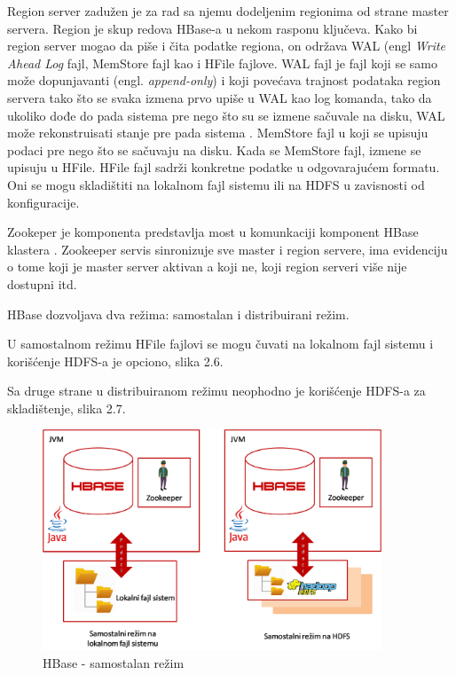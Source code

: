 \documentclass[12pt,oneside]{memoir}
\begin{document}
Region server zadužen je za rad sa njemu dodeljenim regionima od strane master servera. Region je skup redova HBase-a u nekom rasponu ključeva. Kako bi region server mogao da piše i čita podatke regiona, on održava WAL (engl \textit{Write Ahead Log} fajl, MemStore fajl kao i HFile fajlove. WAL fajl je fajl koji se samo može dopunjavanti (engl. \textit{append-only}) i koji povećava trajnost podataka region servera tako što se svaka izmena prvo upiše u WAL kao log komanda, tako da ukoliko dođe do pada sistema pre nego što su se izmene sačuvale na disku, WAL može rekonstruisati stanje pre pada sistema \cite{wal}. MemStore fajl u koji se upisuju podaci pre nego što se sačuvaju na disku. Kada se MemStore fajl, izmene se upisuju u HFile. HFile fajl sadrži konkretne podatke u odgovarajućem formatu. Oni se mogu skladištiti na lokalnom fajl sistemu ili na HDFS u zavisnosti od konfiguracije.

Zookeper je komponenta predstavlja most u komunkaciji komponent HBase klastera \cite{zookeeper}. Zookeeper servis  sinronizuje sve master i region servere, ima evidenciju o tome koji je master server aktivan a koji ne, koji region serveri više nije dostupni itd.

HBase dozvoljava dva režima: samostalan i distribuirani režim.

U samostalnom režimu HFile fajlovi se mogu čuvati na lokalnom fajl sistemu i korišćenje HDFS-a je opciono, slika 2.6.

Sa druge strane u distribuiranom režimu neophodno je korišćenje HDFS-a za skladištenje, slika 2.7. 

\begin{figure}[!ht]
  \centering
  \includegraphics[width=0.9\textwidth]{hbase-standalone.png}
  \caption{HBase - samostalan režim}
  \label{fig:grafikon}
\end{figure}
\end{document}
